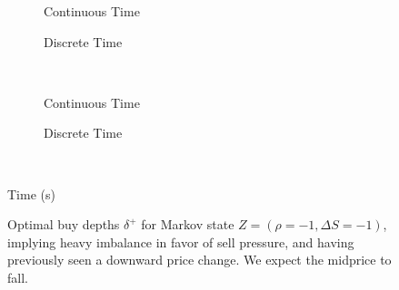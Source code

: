 \begin{figure}
\centering
\begin{subfigure}{.45\linewidth}
  \centering
  \setlength\figureheight{\linewidth} 
  \setlength\figurewidth{\linewidth}
  
  \caption{Continuous Time}
\end{subfigure}%
\hfill%
\begin{subfigure}{.45\linewidth}
  \centering
  \setlength\figureheight{\linewidth} 
  \setlength\figurewidth{\linewidth}
   
  \caption{Discrete Time}
\end{subfigure}\\
\vspace{1cm}
\begin{subfigure}{.45\linewidth}
  \centering
  \setlength\figureheight{\linewidth} 
  \setlength\figurewidth{\linewidth}
  
  \caption{Continuous Time}
\end{subfigure}%
\hfill%
\begin{subfigure}{.45\linewidth}
  \centering
  \setlength\figureheight{\linewidth} 
  \setlength\figurewidth{\linewidth}
   
  \caption{Discrete Time}
\end{subfigure}\\

\leavevmode{}\hspace{0pt plus 1filll}\null

Time (s)

\vspace{1cm}
\begin{subfigure}{\linewidth}
  \centering
   
\end{subfigure}%
  \caption{Optimal buy depths $\delta^{+}$ for Markov state $Z=(\rho = -1, \Delta S = -1)$, implying heavy imbalance in favor of sell pressure, and having previously seen a downward price change. We expect the midprice to fall.}
  \label{fig:comp_dp_z1}
\end{figure}

